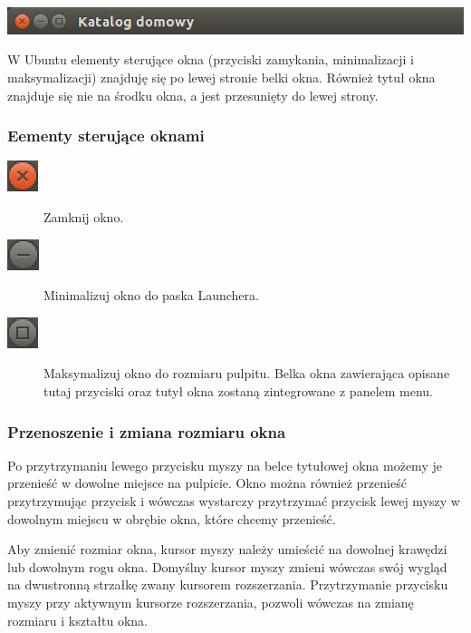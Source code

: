 \begin{center}
	\vspace{-10pt}
	\includegraphics[width=\linewidth]{images/unity_okno_belka.png}
\end{center}

W Ubuntu elementy sterujące okna (przyciski zamykania, minimalizacji i maksymalizacji) znajduję się po lewej stronie belki okna. Również tytuł okna znajduje się nie na środku okna, a jest przesunięty do lewej strony.

\subsubsection{Eementy sterujące oknami}
\begin{description}
\item[\includegraphics{images/unity_okno_exit.png}] Zamknij okno.
\item[\includegraphics{images/unity_okno_min.png}] Minimalizuj okno do paska Launchera.
\item[\includegraphics{images/unity_okno_max.png}] Maksymalizuj okno do rozmiaru pulpitu. Belka okna zawierająca opisane tutaj przyciski oraz tutył okna zostaną zintegrowane z panelem menu.
\end{description}

\subsubsection{Przenoszenie i zmiana rozmiaru okna}
Po przytrzymaniu lewego przycisku myszy na belce tytułowej okna możemy je przenieść w dowolne miejsce na pulpicie. Okno można również przenieść przytrzymując przycisk  i wówczas wystarczy przytrzymać przycisk lewej myszy w dowolnym miejscu w obrębie okna, które chcemy przenieść.

Aby zmienić rozmiar okna, kursor myszy należy umieścić na dowolnej krawędzi lub dowolnym rogu okna. Domyślny kursor myszy zmieni wówczas swój wygląd na dwustronną strzałkę zwany kursorem rozszerzania. Przytrzymanie przycisku myszy przy aktywnym kursorze rozszerzania, pozwoli wówczas na zmianę rozmiaru i kształtu okna.

